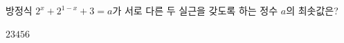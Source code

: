방정식 $2^x+2^{1-x}+3=a$가 서로 다른 두 실근을 갖도록 하는 정수 $a$의 최솟값은?
\begin{choices32}{$2$}{$3$}{$4$}{$5$}{$6$}\end{choices32}
